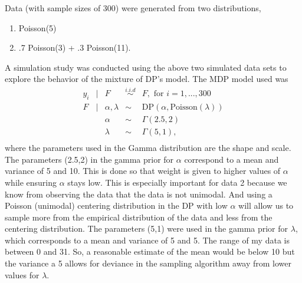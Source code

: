 \documentclass{article}
\begin{document}
\noindent
Data (with sample sizes of 300) were generated from two distributions,
\begin{enumerate}
  \item Poisson(5)
  \item .7 Poisson(3) + .3 Poisson(11).
\end{enumerate}
A simulation study was conducted using the above two simulated data sets to
explore the behavior of the mixture of DP's model. The MDP model used was
\[
  \begin{array}{rclcl}
    y_i &|& F &\overset{i.i.d}{\sim} & F, \text{ for } i=1,...,300 \\
    F &|& \alpha, \lambda &\sim& \text{DP}(\alpha,\text{Poisson}(\lambda)) \\
      && \alpha &\sim& \Gamma(2.5,2) \\
      && \lambda &\sim& \Gamma(5,1), \\
  \end{array}
\]
where the parameters used in the Gamma distribution are the shape and scale. 
The parameters (2.5,2) in the gamma prior for $\alpha$ correspond to a mean and
variance of 5 and 10. This is done so that weight is given to higher values of
$\alpha$ while ensuring $\alpha$ stays low. This is especially important for 
data 2 because we know from observing the data that the data is not unimodal.
And using a Poisson (unimodal) centering distribution in the DP with low
$\alpha$ will allow us to sample more from the empirical distribution of the 
data and less from the centering distribution. The parameters (5,1)
were used in the gamma prior for $\lambda$, which corresponds to a mean 
and variance of 5 and 5. The range of my data is between 0 and 31. So, a reasonable
estimate of the mean would be below 10 but the variance a 5 allows for deviance in
the sampling algorithm away from lower values for $\lambda$.\\
\end{document}
